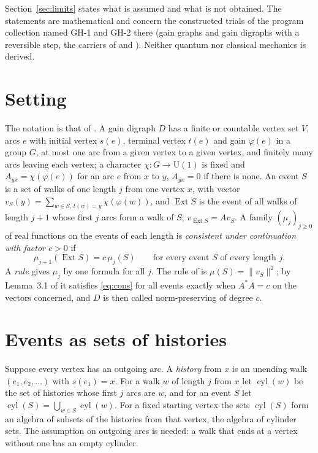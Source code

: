 Section~\ref{sec:limits} states what is assumed and what is not obtained. The statements are mathematical and concern the constructed trials of the program collection named GH-1 and GH-2 there (gain graphs and gain digraphs with a reversible step, the carriers of \cite{g8} and \cite{g9}). Neither quantum nor classical mechanics is derived.

\section{Setting}\label{sec:setting}

The notation is that of \cite{g9}. A gain digraph $D$ has a finite or countable vertex set $V$, arcs $e$ with initial vertex $s(e)$, terminal vertex $t(e)$ and gain $\varphi(e)$ in a group $G$, at most one arc from a given vertex to a given vertex, and finitely many arcs leaving each vertex; a character $\chi\colon G\to\mathrm{U}(1)$ is fixed and $A_{yx}=\chi(\varphi(e))$ for an arc $e$ from $x$ to $y$, $A_{yx}=0$ if there is none. An event $S$ is a set of walks of one length $j$ from one vertex $x$, with vector $v_S(y)=\sum_{w\in S,\,t(w)=y}\chi(\varphi(w))$, and $\operatorname{Ext}S$ is the event of all walks of length $j+1$ whose first $j$ arcs form a walk of $S$; $v_{\operatorname{Ext}S}=Av_S$. A family $(\mu_j)_{j\ge0}$ of real functions on the events of each length is \emph{consistent under continuation with factor $c>0$} if
\begin{equation}\label{eq:cons}
\mu_{j+1}(\operatorname{Ext}S)=c\,\mu_j(S)\qquad\text{for every event }S\text{ of every length }j .
\end{equation}
A \emph{rule} gives $\mu_j$ by one formula for all $j$. The rule of \cite{g8} is $\mu(S)=\lVert v_S\rVert^2$; by Lemma~3.1 of \cite{g9} it satisfies \eqref{eq:cons} for all events exactly when $A^*A=c$ on the vectors concerned, and $D$ is then called norm-preserving of degree $c$.

\section{Events as sets of histories}\label{sec:cyl}

Suppose every vertex has an outgoing arc. A \emph{history} from $x$ is an unending walk $(e_1,e_2,\dots)$ with $s(e_1)=x$. For a walk $w$ of length $j$ from $x$ let $\operatorname{cyl}(w)$ be the set of histories whose first $j$ arcs are $w$, and for an event $S$ let $\operatorname{cyl}(S)=\bigcup_{w\in S}\operatorname{cyl}(w)$. For a fixed starting vertex the sets $\operatorname{cyl}(S)$ form an algebra of subsets of the histories from that vertex, the algebra of cylinder sets. The assumption on outgoing arcs is needed: a walk that ends at a vertex without one has an empty cylinder.

